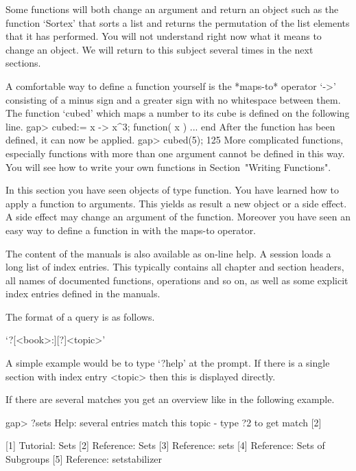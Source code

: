 Some functions will both change an argument  and return an object such as
the function `Sortex'  that sorts a  list and returns the permutation  of
the list  elements that it has  performed.  You will not understand right
now what it means  to change an object.   We will return to this  subject
several times in the next sections.

A comfortable way to define a function yourself is the *maps-to* operator
`->' consisting of  a minus sign and a   greater sign with  no whitespace
between them. The function  `cubed' which maps a  number  to its  cube is
defined on the following line.
\beginexample
gap> cubed:= x -> x^3;
function( x ) ... end
\endexample
After the function has been defined, it can now be applied.
\beginexample
gap> cubed(5);
125
\endexample
More complicated  functions,  especially  functions with   more  than one
argument cannot be defined in this way.
You will see how to write your own {\GAP} functions in
Section~"Writing Functions".

In  this section you have seen {\GAP} objects of type function.  You have
learned how to apply a function to  arguments.  This  yields as result  a
new object or a side effect.  A side effect may change an argument of the
function.   Moreover you have seen an easy  way  to define a  function in
{\GAP} with the maps-to operator.


The  content of  the {\GAP}  manuals is  also available  as on-line  help. A
{\GAP} session loads  a long list of index entries.  This typically contains
all  chapter  and  section  headers,  all  names  of  documented  functions,
operations and so on, as well as  some explicit index entries defined in the
manuals.

The format of a query is as follows.

`?[<book>:][?]<topic>'

A simple example would be to type  `?help' at the {\GAP} prompt. If there is
a single section with index entry <topic> then this is displayed directly.

If  there are  several matches  you get  an overview  like in  the following
example.

\begintt
gap> ?sets
Help: several entries match this topic - type ?2 to get match [2]

[1] Tutorial: Sets
[2] Reference: Sets
[3] Reference: sets
[4] Reference: Sets of Subgroups
[5] Reference: setstabilizer
\endtt


